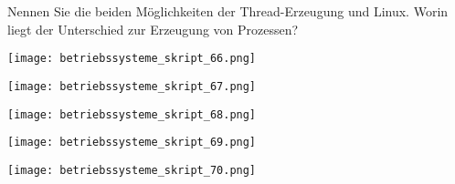 \documentclass{article}
\begin{document}
\begin{tcolorbox}[colback=white!10!white,colframe=lightgray!75!black,
  savelowerto=\jobname_ex.tex,breakable,enhanced,lines before break=40]

\justifying
Nennen Sie die beiden Möglichkeiten der Thread-Erzeugung und Linux. Worin liegt der Unterschied zur Erzeugung von Prozessen?

\tcblower

\justifying
\begin{center}
\texttt{[image: betriebssysteme\_skript\_66.png]}
\end{center}
\begin{center}
\texttt{[image: betriebssysteme\_skript\_67.png]}
\end{center}
\begin{center}
\texttt{[image: betriebssysteme\_skript\_68.png]}
\end{center}
\begin{center}
\texttt{[image: betriebssysteme\_skript\_69.png]}
\end{center}
\begin{center}
\texttt{[image: betriebssysteme\_skript\_70.png]}
\end{center}

\end{tcolorbox}
\end{document}
